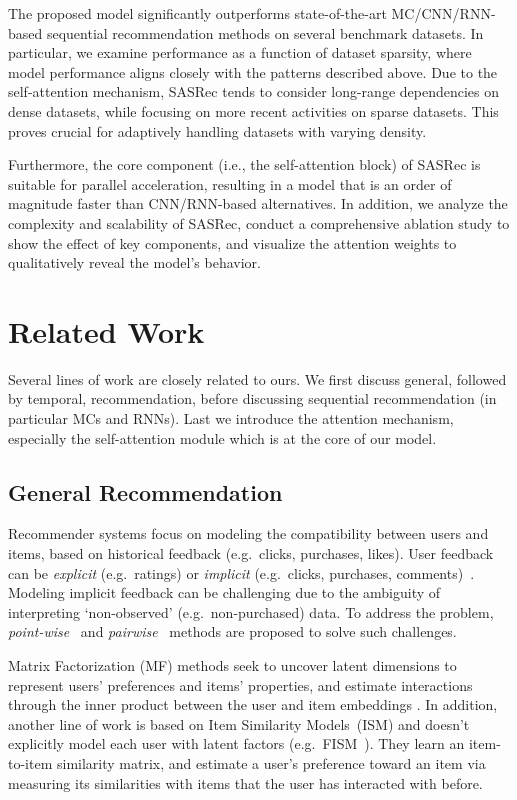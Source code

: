 \documentclass[conference]{IEEEtran}
\begin{document}
The proposed model significantly outperforms state-of-the-art MC/CNN/RNN-based sequential recommendation methods on several benchmark datasets. In particular, we examine performance as a function of dataset sparsity, where model performance aligns closely with the patterns described above.
Due to the self-attention mechanism, SASRec tends to consider long-range dependencies on dense datasets, while focusing on more recent activities on sparse datasets. This proves crucial for adaptively handling datasets with varying density.

Furthermore, the core component (i.e., the self-attention block) of SASRec is suitable for parallel acceleration, 
resulting in a model that is an order of magnitude faster
than CNN/RNN-based alternatives.
In addition, we analyze the complexity and scalability of SASRec, conduct a comprehensive ablation study to show the effect of key components, and visualize the attention weights to qualitatively reveal the model's behavior.






\section{Related Work}


Several lines of work 
are closely related to ours.
We first discuss general, followed by temporal, recommendation, before discussing sequential recommendation (in particular MCs and RNNs). Last we
introduce the attention mechanism, especially the self-attention module which is at the core of our model.


\subsection{General Recommendation}

Recommender systems focus on modeling the compatibility between users and items, based on historical feedback (e.g.~clicks, purchases, likes). User feedback can be \emph{explicit} (e.g.~ratings) or \emph{implicit} (e.g.~clicks, purchases, comments)~\cite{WRMF,rendle2009bpr}. Modeling
implicit feedback can be challenging due to the ambiguity of interpreting `non-observed' (e.g.~non-purchased) data.
To address the problem, \emph{point-wise}~\cite{WRMF} and \emph{pairwise}~\cite{rendle2009bpr} methods are proposed to solve such challenges.

Matrix Factorization (MF) methods seek to uncover latent dimensions to represent users' preferences and items' properties,
and estimate interactions through the inner product between the user and item embeddings \cite{Handbook,korenSurvey}.
In addition, another line of work is based on Item Similarity Models~(ISM) and doesn't explicitly model each user with latent factors (e.g.~FISM~\cite{kabbur2013fism}). They learn 
an
item-to-item similarity matrix, and estimate a user's preference toward an item via measuring its similarities with items that the user has interacted with before.
\end{document}
